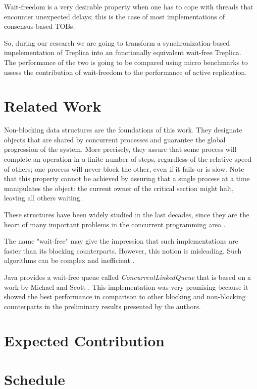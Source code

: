 \documentclass[12pt,twoside,a4paper]{article}
\begin{document}
Wait-freedom is a very  desirable property when one has to cope with threads  that encounter unexpected delays; this  is the case
of  most  implementations of  consensus-based  TOBs. 

So, during  our research   we  are   going   to   transform  a   synchronization-based impelementation  of  Treplica \cite{vieira2008}   into  an  functionally equivalent  wait-free   Treplica.   The  performance of the two is going to be compared using micro benchmarks to assess the contribution  of wait-freedom to the  performance of active replication.

\section{Related Work}
\label{sec:related}

Non-blocking data structures are the foundations of this work. They designate objects that are shared by concurrent processes and guarantee the global progression of the system. More precisely, they  assure that some process will complete an operation in a finite number of steps, regardless of the relative speed of others; one process will never block the other, even if it fails or is slow. Note that this  property cannot be achieved by assuring that a single process at a time manipulates the object: the current owner of the critical section might halt, leaving all others waiting. 

These structures have been widely studied in the last decades, since they are the heart of many important problems in the concurrent	 programming area \cite{herlihy2011art}.

The name "wait-free" may give the impression that such implementations are faster than its blocking counterparts. However, this notion is misleading.  Such algorithms can be complex and inefficient \cite{attiya1994wait}.  

Java provides a wait-free queue called \textit{ConcurrentLinkedQueue} that is based on a work by Michael and Scott \cite{michael1996simple}. This implementation was very promising because it showed the best performance in comparison to other blocking and non-blocking counterparts in the preliminary results presented by the authors. 


\section{Expected Contribution}
\label{sec:contrib}


 
\section{Schedule}
\label{sec:schedule}


\vskip 15mm

{}

\end{document}
